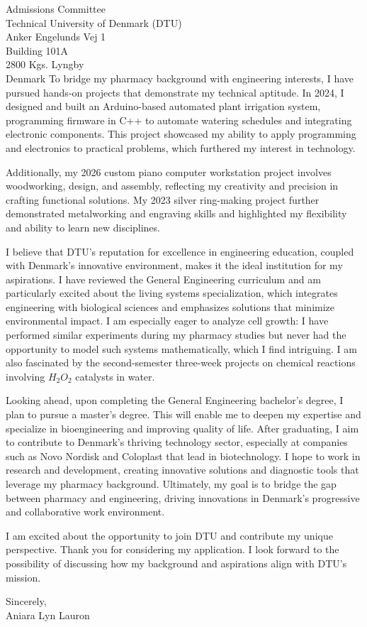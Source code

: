 \documentclass[11pt,a4paper]{letter}
\begin{document}
\begin{letter}{Admissions Committee \\ Technical University of Denmark (DTU) \\ Anker Engelunds Vej 1 \\ Building 101A \\ 2800 Kgs. Lyngby \\ Denmark}
To bridge my pharmacy background with engineering interests, I have pursued hands-on projects that demonstrate my technical aptitude. In 2024, I designed and built an Arduino-based automated plant irrigation system, programming firmware in C++ to automate watering schedules and integrating electronic components. This project showcased my ability to apply programming and electronics to practical problems, which furthered my interest in technology.

Additionally, my 2026 custom piano computer workstation project involves woodworking, design, and assembly, reflecting my creativity and precision in crafting functional solutions. My 2023 silver ring-making project further demonstrated metalworking and engraving skills and highlighted my flexibility and ability to learn new disciplines. 

I believe that DTU's reputation for excellence in engineering education, coupled with Denmark's innovative environment, makes it the ideal institution for my aspirations. I have reviewed the General Engineering curriculum and am particularly excited about the living systems specialization, which integrates engineering with biological sciences and emphasizes solutions that minimize environmental impact. I am especially eager to analyze cell growth: I have performed similar experiments during my pharmacy studies but never had the opportunity to model such systems mathematically, which I find intriguing. I am also fascinated by the second-semester three-week projects on chemical reactions involving $H_2O_2$ catalysts in water.

Looking ahead, upon completing the General Engineering bachelor's degree, I plan to pursue a master's degree. This will enable me to deepen my expertise and specialize in bioengineering and improving quality of life. After graduating, I aim to contribute to Denmark's thriving technology sector, especially at companies such as Novo Nordisk and Coloplast that lead in biotechnology. I hope to work in research and development, creating innovative solutions and diagnostic tools that leverage my pharmacy background. Ultimately, my goal is to bridge the gap between pharmacy and engineering, driving innovations in Denmark's progressive and collaborative work environment.

I am excited about the opportunity to join DTU and contribute my unique perspective. Thank you for considering my application. I look forward to the possibility of discussing how my background and aspirations align with DTU's mission.

\closing{Sincerely, \\
Aniara Lyn Lauron}

\end{letter}
\end{document}
